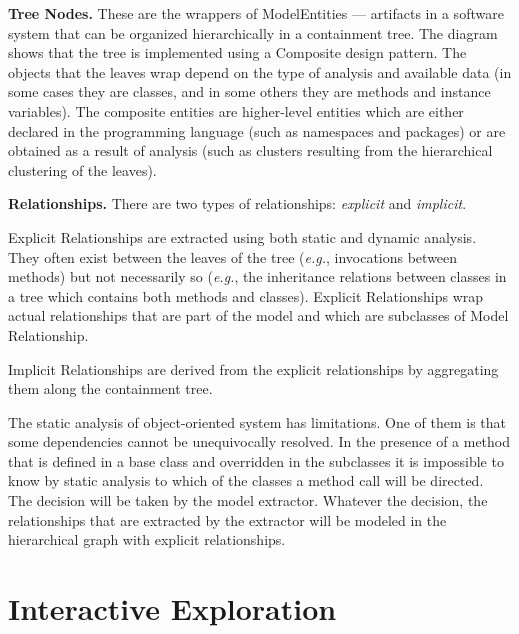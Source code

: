 \documentclass[preprint,12pt]{elsarticle}
\newcommand{\eg}{\emph{e.g.},\xspace}
\begin{document}
\begin{description}

\item {\bf Tree Nodes.} These are the wrappers of ModelEntities --- artifacts in a software system that can be organized hierarchically in a containment tree. The diagram shows that the tree is implemented using a Composite design pattern. The objects that the leaves wrap depend on the type of analysis and available data (in some cases they are classes, and in some others they are methods and instance variables). The composite entities are higher-level entities which are either declared in the programming language (such as namespaces and packages) or are obtained as a result of analysis (such as clusters resulting from the hierarchical clustering of the leaves).

\item {\bf Relationships.} There are two types of relationships: {\em explicit} and {\em implicit}.

Explicit Relationships are extracted using both static and dynamic analysis. They often exist between the leaves of the tree (\eg invocations between methods) but not necessarily so (\eg the inheritance relations between classes in a tree which contains both methods and classes). Explicit Relationships wrap actual relationships that are part of the model and which are subclasses of Model Relationship.

Implicit Relationships are derived from the explicit relationships by aggregating them along the containment tree. 

\end{description}

The static analysis of object-oriented system has limitations. One of them is that some dependencies cannot be unequivocally resolved. In the presence of a method that is defined in a base class and overridden in the subclasses it is impossible to know by static analysis to which of the classes a method call will be directed. The decision will be taken by the model extractor. Whatever the decision, the relationships that are extracted by the extractor will be modeled in the hierarchical graph with explicit relationships.

\newpage
\section {Interactive Exploration} \label {sec:interact}
\end{document}
